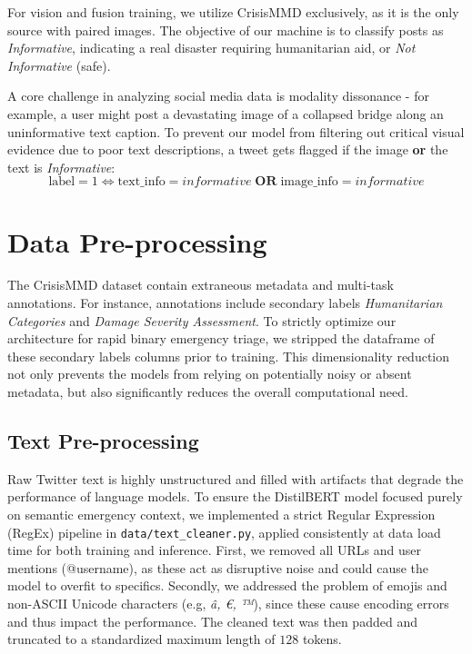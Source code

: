 \documentclass[11pt,letterpaper]{article}
\begin{document}
For vision and fusion training, we utilize CrisisMMD exclusively, as it is the only source with paired images. The objective of our machine is to classify posts as \textit{Informative}, indicating a real disaster requiring humanitarian aid, or \textit{Not Informative} (safe).

A core challenge in analyzing social media data is modality dissonance - for example, a user might post a devastating image of a collapsed bridge along an uninformative text caption. To prevent our model from filtering out critical visual evidence due to poor text descriptions, a tweet gets flagged if the image \textbf{or} the text is \textit{Informative}:
\[
\text{label} = 1 \iff \text{text\_info} = \textit{informative} \;\mathbf{OR}\; \text{image\_info} = \textit{informative}
\]

\section{Data Pre-processing}
The CrisisMMD dataset contain extraneous metadata and multi-task annotations. For instance, annotations include secondary labels \textit{Humanitarian Categories} and \textit{Damage Severity Assessment}. To strictly optimize our architecture for rapid binary emergency triage, we stripped the dataframe of these secondary labels columns prior to training. This dimensionality reduction not only prevents the models from relying on potentially noisy or absent metadata, but also significantly reduces the overall computational need.

\subsection{Text Pre-processing}
Raw Twitter text is highly unstructured and filled with artifacts that degrade the performance of language models. To ensure the DistilBERT \cite{distilbert} model focused purely on semantic emergency context, we implemented a strict Regular Expression (RegEx) pipeline in \texttt{data/text\_cleaner.py}, applied consistently at data load time for both training and inference. First, we removed all URLs and user mentions (@username), as these act as disruptive noise and could cause the model to overfit to specifics. Secondly, we addressed the problem of emojis and non-ASCII Unicode characters (e.g, \textit{â, €, ™}), since these cause encoding errors and thus impact the performance. The cleaned text was then padded and truncated to a standardized maximum length of $128$ tokens.
\end{document}
